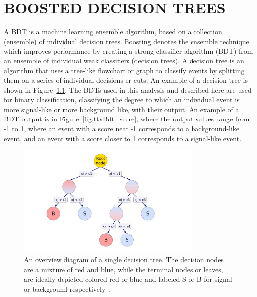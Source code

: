 %
%

\chapter{BOOSTED DECISION TREES}
\label{app:bdts}

A BDT is a machine learning ensemble algorithm, based on a collection (ensemble) of individual decision trees. Boosting denotes the ensemble technique
which improves performance by creating a strong classifier algorithm (BDT) from an ensemble of individual weak classifiers (decision trees). A decision tree
is an algorithm that uses a tree-like flowchart or graph to classify events by splitting them on a series of individual decisions or cuts. An example of a decision tree
is shown in Figure~\ref{fig:dec_tree}. The BDTs used in this analysis and described here are used for binary classification, classifying the degree to which an
individual event is more signal-like or more background like, with their output.
An example of a BDT output is in Figure~\ref{fig:ttvBdt_score}, where the output values range from -1 to 1, where an event with a score near -1 corresponds
to a background-like event, and an event with a score closer to 1 corresponds to a signal-like event.

\begin{figure}[hbtp]
 \begin{center}
   \includegraphics[width=0.8\textwidth]{ap2_figs/decision_tree.pdf}
   \caption[A decision tree diagram.]{An overview diagram of a single decision tree. The decision nodes are a mixture of red and blue,
     while the terminal nodes or leaves, are ideally depicted colored red or blue and labeled S or B for signal or background respectively~\cite{tmva}.}
   \label{fig:dec_tree}
 \end{center}
\end{figure}

